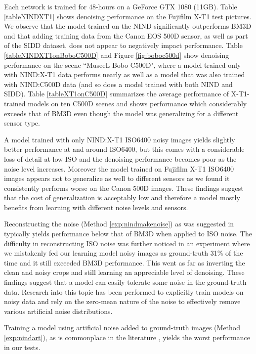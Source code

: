 \documentclass[10pt,twocolumn,letterpaper]{article}
\begin{document}
Each network is trained for 48-hours on a GeForce GTX 1080 (11GB). %
Table \ref{tableNINDXT1} shows denoising performance on the Fujifilm X-T1 test pictures. We observe that the model trained on the NIND significantly outperforms BM3D and that adding training data from the Canon EOS 500D sensor, as well as part of the SIDD dataset, does not appear to negatively impact performance. Table \ref{tableNINDXT1onBoboC500D} and Figure \ref{fig:boboc500d} show denoising performance on the scene ``MuseeL-Bobo-C500D", where a model trained only with NIND:X-T1 data performs nearly as well as a model that was also trained with NIND:C500D data (and so does a model trained with both NIND and SIDD). Table \ref{tableXT1onC500D} summarizes the average performance of X-T1-trained models on ten C500D scenes and shows performance which considerably exceeds that of BM3D even though the model was generalizing for a different sensor type.

A model trained with only NIND:X-T1 ISO6400 noisy images yields slightly better performance at and around ISO6400, but this comes with a considerable loss of detail at low ISO and the denoising performance becomes poor as the noise level increases. Moreover the model trained on Fujifilm X-T1 ISO6400 images appears not to generalize as well to different sensors as we found it consistently performs worse on the Canon 500D images. These findings suggest that the cost of generalization is acceptably low and therefore a model mostly benefits from learning with different noise levels and sensors.

Reconstructing the noise (Method \ref{exp:nindmakenoise}) as was suggested in \cite{dncnn} typically yields performance below that of BM3D when applied to ISO noise. The difficulty in reconstructing ISO noise was further noticed in an experiment where we mistakenly fed our learning model noisy images as ground-truth 31\% of the time and it still exceeded BM3D performance. This went as far as inverting the clean and noisy crops and still learning an appreciable level of denoising. These findings suggest that a model can easily tolerate some noise in the ground-truth data. Research into this topic \cite{noise2noise}  has been performed to explicitly train models on noisy data and rely on the zero-mean nature of the noise to effectively remove various artificial noise distributions.

Training a model using artificial noise added to ground-truth images (Method \ref{exp:nindart}), as is commonplace in the literature \cite{rednet}\cite{dncnn}, yields the worst performance in our tests.
\end{document}
